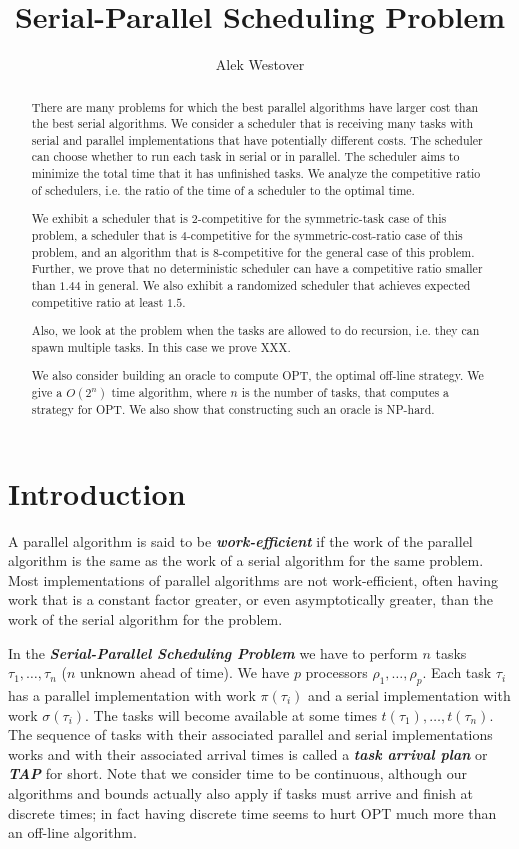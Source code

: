 \documentclass[twocolumn]{article}[10pt]
\author{Alek Westover}
\title{Serial-Parallel Scheduling Problem}
\newcommand{\defn}[1]{{\textit{\textbf{\boldmath #1}}}\xspace}
\begin{document}
\maketitle

\begin{abstract}
  There are many problems for which the best parallel algorithms
  have larger cost than the best serial algorithms. 
  We consider a scheduler that is receiving many tasks with
  serial and parallel implementations that have potentially
  different costs. The scheduler can choose whether to run each
  task in serial or in parallel.
  The scheduler aims to minimize the total time that it has
  unfinished tasks. We analyze the competitive ratio of
  schedulers, i.e. the ratio of the time of a scheduler to the
  optimal time.

  We exhibit a scheduler that is $2$-competitive for the
  symmetric-task case of this problem, a scheduler that is
  $4$-competitive for the symmetric-cost-ratio case of this
  problem, and an algorithm that is $8$-competitive for the
  general case of this problem.
  Further, we prove that no deterministic scheduler can have a competitive
  ratio smaller than $1.44$ in general.
  We also exhibit a randomized scheduler that achieves
  expected competitive ratio at least $1.5$.

  Also, we look at the problem when the tasks are allowed to do
  recursion, i.e. they can spawn multiple tasks. In this case we
  prove XXX.

  We also consider building an oracle to compute OPT, the optimal
  off-line strategy. We give a $O(2^n)$ time algorithm, where $n$
  is the number of tasks, that computes a strategy for OPT. We
  also show that constructing such an oracle is NP-hard.

\end{abstract}

\section{Introduction}
A parallel algorithm is said to be \defn{work-efficient} if the
work of the parallel algorithm is the same as the work of a
serial algorithm for the same problem. Most implementations of
parallel algorithms are not work-efficient, often having work
that is a constant factor greater, or even asymptotically
greater, than the work of the serial algorithm for the problem.

In the \defn{Serial-Parallel Scheduling Problem} we have to
perform $n$ tasks $\tau_1, \ldots, \tau_n$ ($n$ unknown ahead of
time). We have $p$ processors $\rho_1, \ldots, \rho_p$. Each task
$\tau_i$ has a parallel implementation with work $\pi(\tau_i)$ and a
serial implementation with work $\sigma(\tau_i)$. The tasks will become
available at some times $t(\tau_1), \ldots, t(\tau_n)$. 
The sequence of tasks with their associated parallel and serial
implementations works and with their associated arrival times is
called a \defn{task arrival plan} or \defn{TAP} for short.
Note that we consider time to be continuous, although our
algorithms and bounds actually also apply if tasks must arrive
and finish at discrete times; in fact having discrete time seems
to hurt OPT much more than an off-line algorithm.
\end{document}
